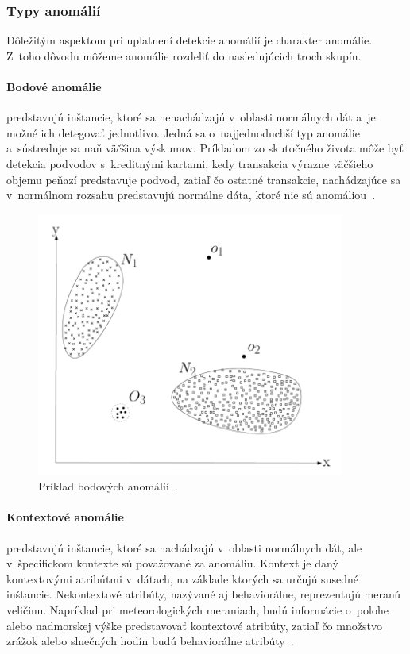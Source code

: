 \documentclass[a4paper,twoside,slovak,12pt,appendix]{article}
\begin{document}
\subsubsection{Typy anomálií}
Dôležitým aspektom pri uplatnení detekcie anomálií je charakter anomálie. Z~toho
dôvodu môžeme anomálie rozdeliť do nasledujúcich troch skupín.

\paragraph{Bodové anomálie} predstavujú inštancie, ktoré sa nenachádzajú
v~oblasti normálnych dát a~je možné ich detegovať jednotlivo. Jedná sa
o~najjednoduchší typ anomálie a~sústreďuje sa naň väčšina výskumov. Príkladom zo
skutočného života môže byť detekcia podvodov s~kreditnými kartami, kedy
transakcia výrazne väčšieho objemu peňazí predstavuje podvod, zatiaľ čo ostatné
transakcie, nachádzajúce sa v~normálnom rozsahu predstavujú normálne dáta, ktoré
nie sú anomáliou~\cite{Chandola2009}.

\begin{figure}[]
  \centering
  \includegraphics[width=0.9\textwidth]{point_anomalies.png}
  \caption{Príklad bodových anomálií~\cite{Chandola2009}.}
  \label{fig:point-anomalies}
\end{figure}

\paragraph{Kontextové anomálie} predstavujú inštancie, ktoré sa nachádzajú
v~oblasti normálnych dát, ale v~špecifickom kontexte sú považované za anomáliu.
Kontext je daný kontextovými atribútmi v~dátach, na základe ktorých sa určujú
susedné inštancie. Nekontextové atribúty, nazývané aj behaviorálne, reprezentujú
meranú veličinu. Napríklad pri meteorologických meraniach, budú informácie
o~polohe alebo nadmorskej výške predstavovať kontextové atribúty, zatiaľ čo
množstvo zrážok alebo slnečných hodín budú behaviorálne
atribúty~\cite{Chandola2009}.
\end{document}
